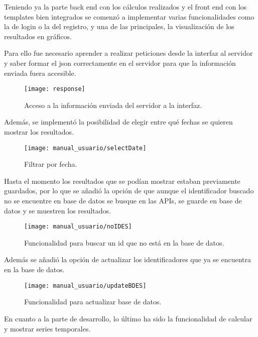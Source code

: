 
Teniendo ya la parte back end con los cálculos realizados y el front end con los templates bien integrados se comenzó a implementar varias funcionalidades como la de login o la del registro, y una de las principales, la visualización de los resultados en gráficos. 


Para ello fue necesario aprender a realizar peticiones desde la interfaz al servidor y saber formar el json correctamente en el servidor para que la información enviada fuera accesible.

\begin{figure}[h]
    \centering
    \texttt{[image: response]}
    \caption{Acceso a la información enviada del servidor a la interfaz.}
    \label{fig:my_label}
\end{figure}
\newpage
Además, se implementó la posibilidad de elegir entre qué fechas se quieren mostrar los resultados.
\begin{figure}[!h]
    \centering
    \texttt{[image: manual\_usuario/selectDate]}
    \caption{Filtrar por fecha.}
    \label{fig:my_label}
\end{figure}
\FloatBarrier
Hasta el momento los resultados que se podían mostrar estaban previamente guardados, por lo que se añadió la opción de que aunque el identificador buscado no se encuentre en base de datos se busque en las APIs, se guarde en base de datos y se muestren los resultados.
\begin{figure}[h]
    \centering
    \texttt{[image: manual\_usuario/noIDES]}
    \caption{Funcionalidad para buscar un id que no está en la base de datos.}
    \label{fig:my_label}
\end{figure}
\FloatBarrier

Además se añadió la opción de actualizar los identificadores que ya se encuentra en la base de datos.
\begin{figure}[h]
    \centering
    \texttt{[image: manual\_usuario/updateBDES]}
    \caption{Funcionalidad para actualizar base de datos.}
    \label{fig:my_label}
\end{figure}
\FloatBarrier

En cuanto a la parte de desarrollo, lo último ha sido la funcionalidad de calcular y mostrar series temporales.


